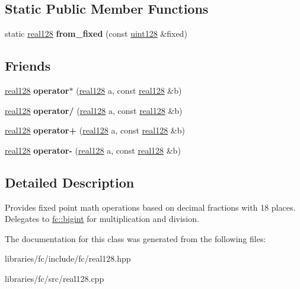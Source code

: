 \subsection*{Static Public Member Functions}
\begin{DoxyCompactItemize}
\item 
\mbox{\label{classfc_1_1real128_a89773971c76d0b6c18b734c20094e3c2}} 
static \mbox{\hyperlink{classfc_1_1real128}{real128}} {\bfseries from\+\_\+fixed} (const \mbox{\hyperlink{classfc_1_1uint128}{uint128}} \&fixed)
\end{DoxyCompactItemize}
\subsection*{Friends}
\begin{DoxyCompactItemize}
\item 
\mbox{\label{classfc_1_1real128_adec78a326c08146b52145ba1bf642948}} 
\mbox{\hyperlink{classfc_1_1real128}{real128}} {\bfseries operator$\ast$} (\mbox{\hyperlink{classfc_1_1real128}{real128}} a, const \mbox{\hyperlink{classfc_1_1real128}{real128}} \&b)
\item 
\mbox{\label{classfc_1_1real128_a199a75624f94f1c33be967ec96012f1d}} 
\mbox{\hyperlink{classfc_1_1real128}{real128}} {\bfseries operator/} (\mbox{\hyperlink{classfc_1_1real128}{real128}} a, const \mbox{\hyperlink{classfc_1_1real128}{real128}} \&b)
\item 
\mbox{\label{classfc_1_1real128_ab8a42837fad8441fec519a38ea2fa2da}} 
\mbox{\hyperlink{classfc_1_1real128}{real128}} {\bfseries operator+} (\mbox{\hyperlink{classfc_1_1real128}{real128}} a, const \mbox{\hyperlink{classfc_1_1real128}{real128}} \&b)
\item 
\mbox{\label{classfc_1_1real128_a4c14234c69ef70cb9524c982aba14b7f}} 
\mbox{\hyperlink{classfc_1_1real128}{real128}} {\bfseries operator-\/} (\mbox{\hyperlink{classfc_1_1real128}{real128}} a, const \mbox{\hyperlink{classfc_1_1real128}{real128}} \&b)
\end{DoxyCompactItemize}


\subsection{Detailed Description}
Provides fixed point math operations based on decimal fractions with 18 places. Delegates to \mbox{\hyperlink{classfc_1_1bigint}{fc\+::bigint}} for multiplication and division. 

The documentation for this class was generated from the following files\+:\begin{DoxyCompactItemize}
\item 
libraries/fc/include/fc/real128.\+hpp\item 
libraries/fc/src/real128.\+cpp\end{DoxyCompactItemize}
